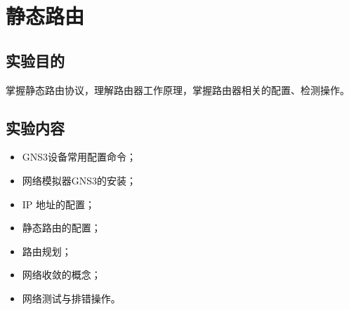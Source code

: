 \documentclass[a4paper,12pt]{report}
\begin{document}
\chapter{静态路由
}
\setcounter{page}{1}
\begin{spacing}{1.5}
\songti{}


\section{实验目的}
掌握静态路由协议，理解路由器工作原理，掌握路由器相关的配置、检测操作。

\section{实验内容}
\begin{itemize}
  \item GNS3设备常用配置命令；
  \item 网络模拟器GNS3的安装；
  \item IP 地址的配置；
  \item 静态路由的配置；
  \item 路由规划；
  \item 网络收敛的概念；
  \item 网络测试与排错操作。
\end{itemize}


\end{spacing}
\end{document}
